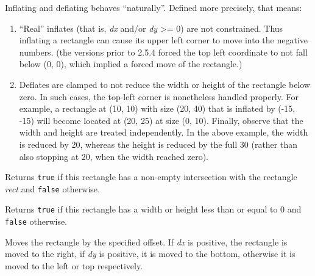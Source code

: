 Inflating and deflating behaves ``naturally''. Defined more precisely, that
means:
\begin{enumerate}
    \item ``Real'' inflates (that is, {\it dx} and/or {\it dy} >= 0) are not
        constrained. Thus inflating a rectangle can cause its upper left corner
        to move into the negative numbers. (the versions prior to 2.5.4 forced
        the top left coordinate to not fall below (0, 0), which implied a
        forced move of the rectangle.)

    \item Deflates are clamped to not reduce the width or height of the
        rectangle below zero. In such cases, the top-left corner is nonetheless
        handled properly. For example, a rectangle at (10, 10) with size (20,
        40) that is inflated by (-15, -15) will become located at (20, 25) at
        size (0, 10). Finally, observe that the width and height are treated
        independently. In the above example, the width is reduced by 20,
        whereas the height is reduced by the full 30 (rather than also stopping
        at 20, when the width reached zero).
\end{enumerate}




\label{wxrectintersects}


Returns {\tt true} if this rectangle has a non-empty intersection with the
rectangle {\it rect} and {\tt false} otherwise.


\label{wxrectisempty}


Returns {\tt true} if this rectangle has a width or height less than or equal to 
0 and {\tt false} otherwise.


\label{wxrectoffset}



Moves the rectangle by the specified offset. If {\it dx} is positive, the
rectangle is moved to the right, if {\it dy} is positive, it is moved to the
bottom, otherwise it is moved to the left or top respectively.


